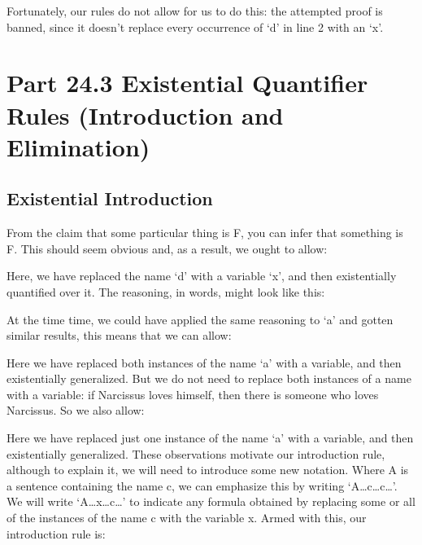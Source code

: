 Fortunately, our rules do not allow for us to do this: the attempted proof is banned, since it doesn’t replace every occurrence of ‘d’ in line 2 with an ‘x’.
\section{Part 24.3 Existential Quantifier Rules (Introduction and Elimination)}
\subsection{Existential Introduction}

From the claim that some particular thing is F, you can infer that something is F. This should seem obvious and, as a result, we ought to allow:
\begin{fitchproof}
\end{fitchproof}

Here, we have replaced the name ‘d’ with a variable ‘x’, and then existentially quantified over it. The reasoning, in words, might look like this:


At the time time, we could have applied the same reasoning to ‘a' and gotten similar results, this means that we can allow:
\begin{fitchproof}
\end{fitchproof}

Here we have replaced both instances of the name ‘a’ with a variable, and then existentially generalized. But we do not need to replace both instances of a name with a variable: if Narcissus loves himself, then there is someone who loves Narcissus. So we also allow:
\begin{fitchproof}
\end{fitchproof}

Here we have replaced just one instance of the name ‘a’ with a variable, and then existentially generalized. These observations motivate our introduction rule, although to explain it, we will need to introduce some new notation. Where A is a sentence containing the name c, we can emphasize this by writing ‘A\ldots c\ldots c\ldots ’. We will write ‘A\ldots x\ldots c\ldots ’ to indicate any formula obtained by replacing some or all of the instances of the name c with the variable x. Armed with this, our introduction rule is:

